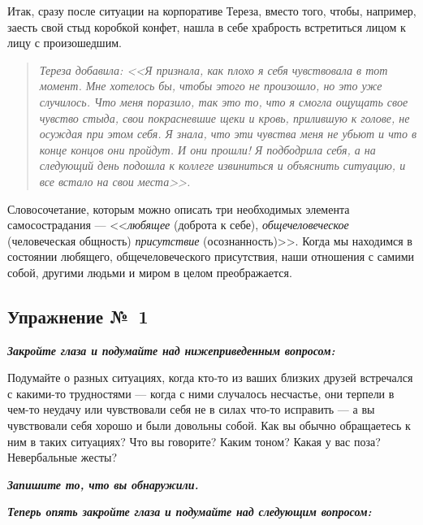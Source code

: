 Итак, сразу после ситуации на корпоративе Тереза, вместо того, чтобы, например, заесть свой стыд коробкой конфет, нашла в себе храбрость встретиться лицом к лицу с произошедшим.

\begin{quote} 
\textit{Тереза добавила: <<Я признала, как плохо я себя чувствовала в тот момент. Мне хотелось бы,  чтобы этого не произошло, но это уже случилось. Что меня поразило, так это то, что я смогла ощущать свое чувство стыда, свои покрасневшие щеки и кровь, прилившую к голове, не осуждая при этом себя. Я знала, что эти чувства меня не убьют и что в конце концов они пройдут. И они прошли! Я подбодрила себя, а на следующий день подошла к коллеге извиниться и объяснить ситуацию, и все встало на свои места>>.}
\end{quote}

Словосочетание, которым можно описать три необходимых элемента самосострадания --- <<\emph{любящее} (доброта к себе), \emph{общечеловеческое} (человеческая общность) \emph{присутствие} (осознанность)>>. Когда мы находимся в состоянии любящего, общечеловеческого присутствия, наши отношения с самими собой, другими людьми и миром в целом преображается.


\newpage


\subsection{Упражнение №~1}


\vspace{3ex}

\textbf{\textit{Закройте глаза и подумайте над нижеприведенным вопросом: }}

Подумайте о разных ситуациях, когда кто-то из ваших близких друзей встречался с какими-то трудностями --- когда с ними случалось несчастье, они терпели в чем-то неудачу или чувствовали себя не в силах что-то исправить --- а вы чувствовали себя хорошо и были довольны собой. Как вы обычно обращаетесь к ним в таких ситуациях? 
Что вы говорите? Каким тоном? Какая у вас поза? Невербальные жесты? 

\vspace{2ex}

\textbf{\textit{Запишите то, что вы обнаружили.}}


\newpage


\textbf{\textit{Теперь опять закройте глаза и подумайте над следующим вопросом:}}

